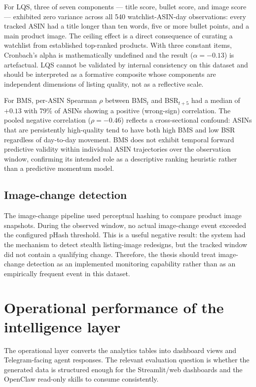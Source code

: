 For LQS, three of seven components --- title score, bullet score, and image
score --- exhibited zero variance across all 540 watchlist-ASIN-day
observations: every tracked ASIN had a title longer than ten words, five or
more bullet points, and a main product image. The ceiling effect is a direct
consequence of curating a watchlist from established top-ranked products. With
three constant items, Cronbach's alpha is mathematically undefined and the
result ($\alpha = -0.13$) is artefactual. LQS cannot be validated by internal
consistency on this dataset and should be interpreted as a formative composite
whose components are independent dimensions of listing quality, not as a
reflective scale.

For BMS, per-ASIN Spearman $\rho$ between BMS$_t$ and BSR$_{t+5}$ had a
median of $+0.13$ with 79\% of ASINs showing a positive (wrong-sign)
correlation. The pooled negative correlation ($\rho = -0.46$) reflects a
cross-sectional confound: ASINs that are persistently high-quality tend to have
both high BMS and low BSR regardless of day-to-day movement. BMS does not
exhibit temporal forward predictive validity within individual ASIN trajectories
over the observation window, confirming its intended role as a
descriptive ranking heuristic rather than a predictive momentum model.

\subsection{Image-change detection}

The image-change pipeline used perceptual hashing to compare product image snapshots. During the observed window, no actual image-change event exceeded the configured pHash threshold. This is a useful negative result: the system had the mechanism to detect stealth listing-image redesigns, but the tracked window did not contain a qualifying change. Therefore, the thesis should treat image-change detection as an implemented monitoring capability rather than as an empirically frequent event in this dataset.

\section{Operational performance of the intelligence layer}

The operational layer converts the analytics tables into dashboard views and Telegram-facing agent responses. The relevant evaluation question is whether the generated data is structured enough for the Streamlit/web dashboards and the OpenClaw read-only skills to consume consistently.

